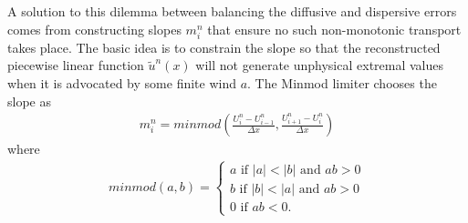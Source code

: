 A solution to this dilemma between balancing the diffusive and dispersive errors comes from constructing slopes $m_i^n$ that ensure no such non-monotonic transport takes place.
The basic idea is to constrain the slope so that the reconstructed piecewise linear function $\tilde{u}^n(x)$ will not generate unphysical extremal values when it is advocated by some finite wind $a$.
The Minmod limiter chooses the slope as
\begin{gather}
m_i^n = minmod\left(\frac{U_i^n-U_{i-1}^n}{\Delta x},\frac{U_{i+1}^n-U_{i}^n}{\Delta x}\right)
\end{gather}
where
\begin{gather}
minmod(a,b) = \left\{\begin{array}{ccc}a  \mbox{ if } |a| < |b|  \mbox{ and } ab>0\\
b  \mbox{ if } |b|<|a|  \mbox{ and } ab>0\\ 0  \mbox{ if } ab < 0 .\end{array}\right.
\end{gather}



